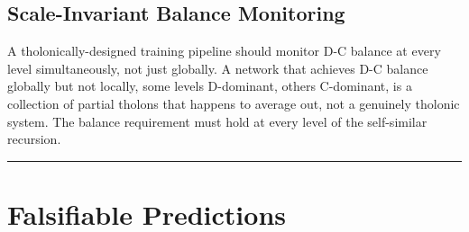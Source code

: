 \documentclass[12pt]{article}
\begin{document}
\subsection{Scale-Invariant Balance Monitoring}\label{scale-invariant-balance-monitoring}

A tholonically-designed training pipeline should monitor D-C balance at
every level simultaneously, not just globally. A network that achieves
D-C balance globally but not locally, some levels D-dominant, others
C-dominant, is a collection of partial tholons that happens to average
out, not a genuinely tholonic system. The balance requirement must hold
at every level of the self-similar recursion.

\begin{center}\rule{0.5\linewidth}{0.5pt}\end{center}

\section{Falsifiable Predictions}\label{falsifiable-predictions}
\end{document}
